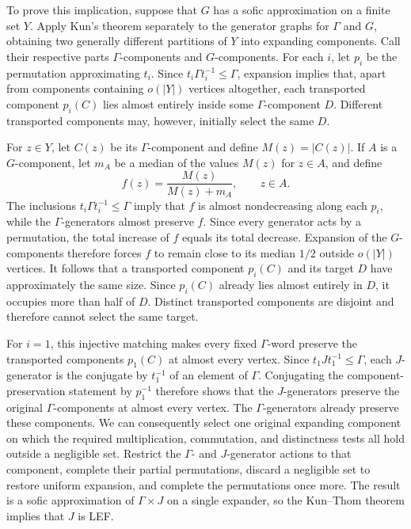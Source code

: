 \documentclass[10pt]{article}
\newcommand{\abs}[1]{\left|#1\right|}
\begin{document}
To prove this implication, suppose that $G$ has a sofic approximation on a finite set $Y$. Apply Kun's theorem separately to the generator graphs for $\Gamma$ and $G$, obtaining two generally different partitions of $Y$ into expanding components. Call their respective parts $\Gamma$-components and $G$-components. For each $i$, let $p_i$ be the permutation approximating $t_i$. Since $t_i\Gamma t_i^{-1}\leq\Gamma$, expansion implies that, apart from components containing $o(\abs{Y})$ vertices altogether, each transported component $p_i(C)$ lies almost entirely inside some $\Gamma$-component $D$. Different transported components may, however, initially select the same $D$.

For $z\in Y$, let $C(z)$ be its $\Gamma$-component and define $M(z)=\abs{C(z)}$. If $A$ is a $G$-component, let $m_A$ be a median of the values $M(z)$ for $z\in A$, and define
\[
f(z)=\frac{M(z)}{M(z)+m_A},\qquad z\in A.
\]
The inclusions $t_i\Gamma t_i^{-1}\leq\Gamma$ imply that $f$ is almost nondecreasing along each $p_i$, while the $\Gamma$-generators almost preserve $f$. Since every generator acts by a permutation, the total increase of $f$ equals its total decrease. Expansion of the $G$-components therefore forces $f$ to remain close to its median $1/2$ outside $o(\abs{Y})$ vertices. It follows that a transported component $p_i(C)$ and its target $D$ have approximately the same size. Since $p_i(C)$ already lies almost entirely in $D$, it occupies more than half of $D$. Distinct transported components are disjoint and therefore cannot select the same target.

For $i=1$, this injective matching makes every fixed $\Gamma$-word preserve the transported components $p_1(C)$ at almost every vertex. Since $t_1Jt_1^{-1}\leq\Gamma$, each $J$-generator is the conjugate by $t_1^{-1}$ of an element of $\Gamma$. Conjugating the component-preservation statement by $p_1^{-1}$ therefore shows that the $J$-generators preserve the original $\Gamma$-components at almost every vertex. The $\Gamma$-generators already preserve these components. We can consequently select one original expanding component on which the required multiplication, commutation, and distinctness tests all hold outside a negligible set. Restrict the $\Gamma$- and $J$-generator actions to that component, complete their partial permutations, discard a negligible set to restore uniform expansion, and complete the permutations once more. The result is a sofic approximation of $\Gamma\times J$ on a single expander, so the Kun--Thom theorem implies that $J$ is LEF.
\end{document}
